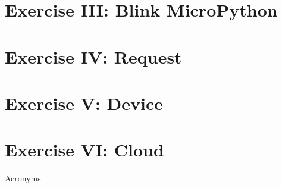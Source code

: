 \documentclass[aspectratio=169]{beamer}
\begin{document}
\section{Exercise III: Blink MicroPython}


\section{Exercise IV:  Request}


\section{Exercise V:  Device}


\section{Exercise VI:  Cloud}


% 

\appendix

\begin{frame}[allowframebreaks]{Acronyms}
    \printglossary[type=\acronymtype, nonumberlist]
\end{frame}

%     
\end{document}
